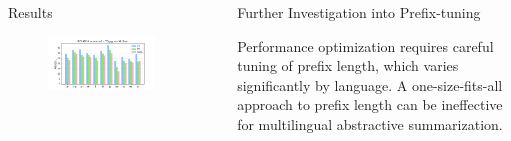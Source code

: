 \documentclass[final]{beamer}
\newlength{\sepwidth}
\newlength{\colwidth}
\newcommand{\separatorcolumn}{\begin{column}{\sepwidth}\end{column}}
\begin{document}
\begin{frame}[t]
\begin{columns}[t]
\begin{column}{\colwidth}
\begin{block}{Results}
    \begin{figure}
    \centering
    \includegraphics[width=\textwidth]{fig/mt5-result.png}
    \end{figure}
  \end{block}

\end{column}

\separatorcolumn

\begin{column}{\colwidth}


  \begin{block}{Further Investigation into Prefix-tuning}

    Performance optimization requires careful tuning of prefix length, which varies significantly by language.
    A one-size-fits-all approach to prefix length can be ineffective for multilingual abstractive summarization.


\end{block}
\end{column}
\end{columns}
\end{frame}
\end{document}
